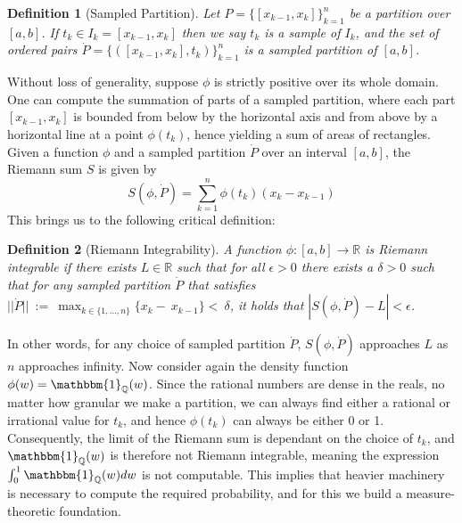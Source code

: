 \documentclass[10pt, oneside]{article}
\newcommand{\R}{\mathbb{R}}
\newcommand{\Q}{\mathbb{Q}}
\newtheorem{defn}{Definition}
\begin{document}
\begin{defn}[Sampled Partition]
\label{defn:samplepartition}
Let $P=\{[x_{k-1},x_{k}]\}_{k=1}^n$ be a partition over $[a,b]$. If $t_k \in I_k=[x_{k-1},x_k]$ then we say $t_k$ is a sample of $I_k$, and the set of ordered pairs $\dot{P}=\{([x_{k-1},x_{k}],t_k)\}_{k=1}^n$ is a sampled partition of $[a,b]$.
\end{defn}

Without loss of generality, suppose $\phi$ is strictly positive over its whole domain.
One can compute the summation of parts of a sampled partition, where each part $[x_{k-1},x_k]$ is bounded from below by the horizontal axis and from above by a horizontal line at a point $\phi(t_k)$, hence yielding a sum of areas of rectangles.
Given a function $\phi$ and a sampled partition $\dot{P}$ over an interval $[a,b]$, the Riemann sum $S$ is given by 
$$S(\phi,\dot{P})=\sum_{k=1}^n\phi(t_k)(x_k-x_{k-1})$$
This brings us to the following critical definition:

\begin{defn}[Riemann Integrability]
\label{defn:riemann}
A function $\phi:[a,b]\to \R$ is Riemann integrable if there exists $L\in \R$ such that for all $\epsilon>0$ there exists a $\delta >0$ such that for any sampled partition $\dot{P}$ that satisfies $||\dot{P}||~:=~\max_{k\in\{1,\ldots,n\}}\{x_{k}-~x_{k-1}\}<~\delta$, it holds that $|S(\phi,\dot{P})-L|<\epsilon$.
\end{defn}

In other words, for any choice of sampled partition $\dot{P}$, $S(\phi,\dot{P})$ approaches $L$ as $n$ approaches infinity.
Now consider again the density function $\phi(w)=\mathbbm{1}_{\Q}(w)$.
Since the rational numbers are dense in the reals, no matter how granular we make a partition, we can always find either a rational or irrational value for $t_k$, and hence $\phi(t_k)$ can always be either 0 or 1. 
Consequently, the limit of the Riemann sum is dependant on the choice of $t_k$, and $\mathbbm{1}_{\Q}(w)$ is therefore not Riemann integrable, meaning the expression $\int_{0}^{1}\mathbbm{1}_{\Q}(w)dw$ is not computable.
This implies that heavier machinery is necessary to compute the required probability, and for this we build a measure-theoretic foundation.
\end{document}
